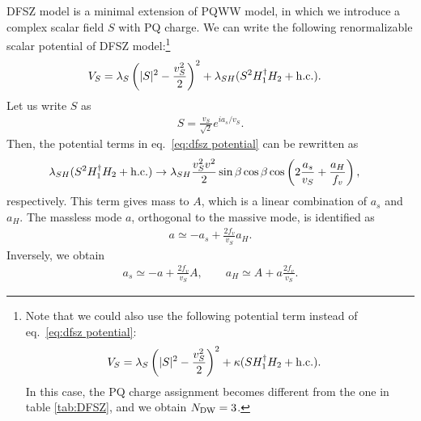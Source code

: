 \documentclass[11pt,a4paper]{article}
\begin{document}
DFSZ model \cite{Zhitnitsky:1980tq, Dine:1981rt} is a minimal extension of PQWW model, in which we introduce a complex scalar field $S$ with PQ charge. We can write the following renormalizable scalar potential of DFSZ model:\footnote{
Note that we could also use the following potential term instead of eq.~\eqref{eq:dfsz potential}:
\begin{align}
    V_S &= \lambda_S \left( |S|^2 - \frac{v_S^2}{2} \right)^2 + \kappa (S H_1^\dagger H_2 + {\rm h.c.}).
\end{align}
In this case, the PQ charge assignment becomes different from the one in table \ref{tab:DFSZ}, and we obtain $N_{\rm DW} = 3$.}
\begin{align}
    V_S &= \lambda_S \left( |S|^2 - \frac{v_S^2}{2} \right)^2 + \lambda_{SH} (S^2 H_1^\dagger H_2 + {\rm h.c.}).\label{eq:dfsz potential}
\end{align}
Let us write $S$ as
\begin{align}
    S = \frac{v_S}{\sqrt{2}} e^{i a_s/v_S}.
\end{align}
Then, the potential terms in eq.~\eqref{eq:dfsz potential} can be rewritten as
\begin{align}
    \lambda_{SH} (S^2 H_1^\dagger H_2 + {\rm h.c.}) &\to \lambda_{SH} \frac{v_S^2 v^2}{2} \sin\beta\cos\beta \cos\left( 2\frac{a_s}{v_S} + \frac{a_H}{f_v} \right),
\end{align}
respectively. This term gives mass to $A$, which is a linear combination of $a_s$ and $a_H$. The massless mode $a$, orthogonal to the massive mode, is identified as
\begin{align}
    a \simeq -a_s + \frac{2f_v}{v_S} a_H.
\end{align}
Inversely, we obtain
\begin{align}
    a_s \simeq -a + \frac{2f_v}{v_S} A, \qquad
    a_H \simeq A + a \frac{2f_v}{v_S}.
\end{align}
\end{document}
